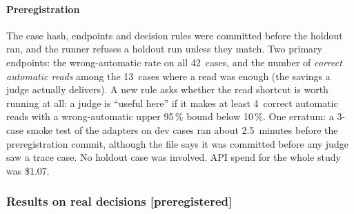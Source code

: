 \documentclass[11pt,letterpaper]{article}
\newcommand{\prereg}{\mbox{\textsf{\small\color{okblue}[preregistered]}}}
\newcommand{\TrN}{42}
\newcommand{\TrReadCases}{13}
\newcommand{\TrSmokeCases}{3}
\newcommand{\TrSmokeMinutes}{2.5}
\newcommand{\TrSpendTotal}{1.07}
\newcommand{\TrUsefulMaxUpperPct}{10}
\newcommand{\TrUsefulMinReads}{4}
\begin{document}
\paragraph{Preregistration} The case hash, endpoints and decision rules were committed before the holdout
ran, and the runner refuses a holdout run unless they match. Two primary endpoints: the wrong-automatic rate
on all \TrN\ cases, and the number of \emph{correct automatic reads} among the \TrReadCases\ cases where a
read was enough (the savings a judge actually delivers). A new rule asks whether the read shortcut is worth
running at all: a judge is ``useful here'' if it makes at least \TrUsefulMinReads\ correct automatic reads
with a wrong-automatic upper 95\,\% bound below \TrUsefulMaxUpperPct\,\%. One erratum: a
\TrSmokeCases-case smoke test of the adapters on dev cases ran about \TrSmokeMinutes\ minutes before the
preregistration commit, although the file says it was committed before any judge saw a trace case. No
holdout case was involved. API spend for the whole study was \$\TrSpendTotal.

\subsubsection{Results on real decisions \texorpdfstring{\prereg}{[preregistered]}}\label{jb:sec:traceresults}
\end{document}
